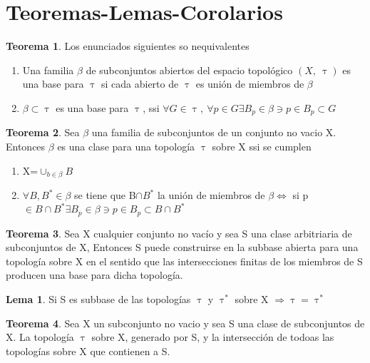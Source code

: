 \documentclass{article}
\theoremstyle{definition}
\newtheorem{theorem}{Teorema}[section]
\newtheorem{lemma}{Lema}[section]
\begin{document}
\newpage
\section{Teoremas-Lemas-Corolarios}
\begin{theorem}
	Los enunciados siguientes so nequivalentes
	\begin{enumerate}
		\item Una familia $\beta$ de subconjuntos abiertos del espacio topológico $(X,\ \uptau)$ es una base para $\uptau$ si cada abierto de $\uptau$ es unión de miembros de $\beta$
		\item $\beta\subset\uptau$ es una base para $\uptau$, ssi $\forall G\in \uptau,\ \forall p\in G \exists B_p\in\beta\ni p\in B_p\subset G$ 
	\end{enumerate}
\end{theorem}


\begin{theorem}
	 Sea $\beta$ una familia de subconjuntos de un conjunto no vacio X. Entonces $\beta$ es una clase para una topología $\uptau$ sobre X ssi se cumplen 
	 \begin{enumerate}
	 \item X=$\cup_{b\in\beta} B$
	 \item $\forall B, B^*\in\beta$ se tiene que B$\cap B^*$ la unión de miembros de $\beta \Leftrightarrow$ si p$\in B\cap B^*\exists B_p\in\beta\ni p\in B_p\subset B\cap B^*$ 
	 \end{enumerate}
\end{theorem}


\begin{theorem}
	Sea X cualquier conjunto no vacío y sea S una clase arbitriaria de subconjuntos de X, Entonces S puede construirse en la subbase abierta para una topología sobre X en el sentido que las intersecciones finitas de los miembros de S producen una base para dicha topología.
\end{theorem}


\begin{lemma}
Si S es subbase de las topologías $\uptau$ y $\uptau^*$  sobre X $\Rightarrow\uptau = \uptau^*$
\end{lemma}


\begin{theorem}
Sea X un subconjunto no vacio y sea S una clase de subconjuntos de X. La topología $\uptau$ sobre X, generado por S, y la intersección de todoas las topologías sobre X que contienen a S. 
\end{theorem}
\end{document}
